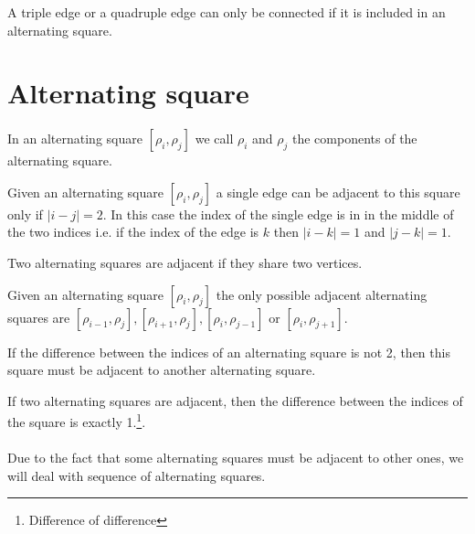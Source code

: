 \begin{proposition}
  \label{continue-triple-edge}
  A triple edge or a quadruple edge can only be connected if it is included in an alternating square.
\end{proposition}

\section{Alternating square}

\paragraph{}
In an alternating square $[\rho_i, \rho_j]$ we call $\rho_i$ and $\rho_j$ the components of the alternating square.

\begin{proposition}
  \label{square-connection}
  Given an alternating square $[\rho_i, \rho_j]$ a single edge can be adjacent to this square only if $|i - j| = 2$. In this case the index of the single edge is in in the middle of the two indices i.e. if the index of the edge is $k$ then $|i-k| = 1$ and $|j-k| = 1$.
\end{proposition}

\begin{definition}
  Two alternating squares are adjacent if they share two vertices.
\end{definition}

\begin{proposition}
  \label{adjacent-squares}
  Given an alternating square $[\rho_i, \rho_j]$ the only possible adjacent alternating squares are $[\rho_{i-1}, \rho_j], [\rho_{i+1}, \rho_j], [\rho_i, \rho_{j-1}]$ or $[\rho_i, \rho_{j+1}]$.
\end{proposition}

\begin{corollary}
  \label{continue-alternating-square}
  If the difference between the indices of an alternating square is not 2, then this square must be adjacent to another alternating square.
\end{corollary}

\begin{corollary}
  If two alternating squares are adjacent, then the difference between the indices of the square is exactly 1.\footnote{Difference of difference}.
\end{corollary}

\paragraph{}
Due to the fact that some alternating squares must be adjacent to other ones, we will deal with sequence of alternating squares.


